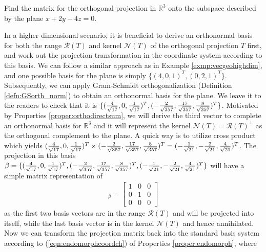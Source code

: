 \begin{exmp}
\label{exmp:planeorthoproj}
Find the matrix for the orthogonal projection in $\mathbb{R}^3$ onto the subspace described by the plane $x + 2y - 4z = 0$.
\end{exmp}
\begin{solution}
In a higher-dimensional scenario, it is beneficial to derive an orthonormal basis for both the range $\mathcal{R}(T)$ and kernel $\mathcal{N}(T)$ of the orthogonal projection $T$ first, and work out the projection transformation in the coordinate system according to this basis. We can follow a similar approach as in Example \ref{exmp:vecgeohighdim}, and one possible basis for the plane is simply $\{(4,0,1)^T, (0,2,1)^T\}$. Subsequently, we can apply Gram-Schmidt orthogonalization (Definition \ref{defn:GSorth_norm}) to obtain an orthonormal basis for the plane. We leave it to the readers to check that it is $\smash{\{(\frac{4}{\sqrt{17}}, 0, \frac{1}{\sqrt{17}})^T}, \smash{(-\frac{2}{\sqrt{357}}, \frac{17}{\sqrt{357}}, \frac{8}{\sqrt{357}})^T}\}$. Motivated by Properties \ref{proper:orthodirectsum}, we will derive the third vector to complete an orthonormal basis for $\mathbb{R}^3$ and it will represent the kernel $\mathcal{N}(T) = \mathcal{R}(T)^\perp$ as the orthogonal complement to the plane. A quick way is to utilize cross product which yields $\smash{(\frac{4}{\sqrt{17}}, 0, \frac{1}{\sqrt{17}})^T} \times \smash{(-\frac{2}{\sqrt{357}}, \frac{17}{\sqrt{357}}, \frac{8}{\sqrt{357}})^T} = \smash{(-\frac{1}{\sqrt{21}}, -\frac{2}{\sqrt{21}}, \frac{4}{\sqrt{21}})^T}$. The projection in this basis $\beta = \smash{\{(\frac{4}{\sqrt{17}}, 0, \frac{1}{\sqrt{17}})^T}, \smash{(-\frac{2}{\sqrt{357}}, \frac{17}{\sqrt{357}}, \frac{8}{\sqrt{357}})^T}, \smash{(-\frac{1}{\sqrt{21}}, -\frac{2}{\sqrt{21}}, \frac{4}{\sqrt{21}})^T\}}$ will have a simple matrix representation of
\begin{align*}
[T]_\beta = 
\begin{bmatrix}
1 & 0 & 0 \\
0 & 1 & 0 \\
0 & 0 & 0
\end{bmatrix}
\end{align*}
as the first two basis vectors are in the range $\mathcal{R}(T)$ and will be projected into itself, while the last basis vector is in the kernel $\mathcal{N}(T)$ and hence annihilated. Now we can transform the projection matrix back into the standard basis system according to (\ref{eqn:endomorphcoordch}) of Properties \ref{proper:endomorph}, where
\begin{align*}

\end{align*}
\end{solution}
